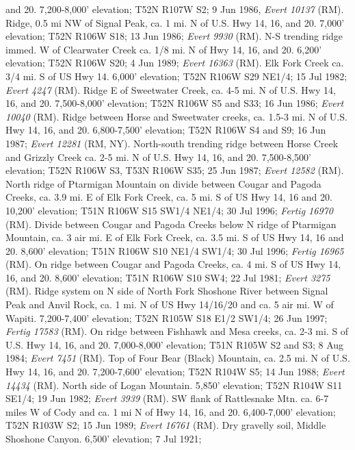 and 20. 7,200-8,000’ elevation; T52N R107W S2; 9 Jun 1986,
\textit{Evert 10137} (RM).
Ridge, 0.5 mi NW of Signal Peak, ca. 1 mi. N of U.S. Hwy 14, 16, and 20. 7,000’
elevation; T52N R106W S18; 13 Jun 1986; \textit{Evert 9930} (RM).
N-S trending ridge immed. W of Clearwater Creek ca. 1/8 mi. N of Hwy 14, 16,
and 20. 6,200’ elevation; T52N R106W S20; 4 Jun 1989; \textit{Evert 16363} (RM).
Elk Fork Creek ca. 3/4 mi. S of US Hwy 14. 6,000’ elevation; T52N R106W S29
NE1/4; 15 Jul 1982; \textit{Evert 4247} (RM).
Ridge E of Sweetwater Creek, ca. 4-5 mi. N of U.S. Hwy 14, 16, and 20.
7,500-8,000’ elevation;  T52N R106W S5 and S33; 16 Jun 1986;
\textit{Evert 10040} (RM).
Ridge between Horse and Sweetwater creeks, ca. 1.5-3 mi. N of U.S. Hwy 14, 16,
and 20. 6,800-7,500’ elevation; T52N R106W S4 and S9; 16 Jun 1987;
\textit{Evert 12281} (RM, NY).
North-south trending ridge between Horse Creek and Grizzly Creek ca. 2-5 mi. N
of U.S. Hwy 14, 16, and 20. 7,500-8,500’ elevation; T52N R106W S3, T53N R106W
S35; 25 Jun 1987; \textit{Evert 12582} (RM).
North ridge of Ptarmigan Mountain on divide between Cougar and Pagoda Creeks,
ca. 3.9 mi. E of Elk Fork Creek, ca. 5 mi. S of US Hwy 14, 16 and 20. 10,200’
elevation; T51N R106W S15 SW1/4 NE1/4; 30 Jul 1996; \textit{Fertig 16970} (RM).
Divide between Cougar and Pagoda Creeks below N ridge of Ptarmigan Mountain,
ca. 3 air mi. E of Elk Fork Creek, ca. 3.5 mi. S of US Hwy 14, 16 and 20.
8,600’ elevation; T51N R106W S10 NE1/4 SW1/4; 30 Jul 1996;
\textit{Fertig 16965} (RM).
On ridge between Cougar and Pagoda Creeks, ca. 4 mi. S of US Hwy 14, 16, and 20.
8,600’ elevation; T51N R106W S10 SW4; 22 Jul 1981; \textit{Evert 3275} (RM).
Ridge system on N side of North Fork Shoshone River between Signal Peak and
Anvil Rock, ca. 1 mi. N of US Hwy 14/16/20 and ca. 5 air mi. W of Wapiti.
7,200-7,400’ elevation; T52N R105W S18 E1/2 SW1/4; 26 Jun 1997;
\textit{Fertig 17583} (RM).
On ridge between Fishhawk and Mesa creeks, ca. 2-3 mi. S of U.S. Hwy 14, 16,
and 20. 7,000-8,000’ elevation; T51N R105W S2 and S3; 8 Aug 1984;
\textit{Evert 7451} (RM).
Top of Four Bear (Black) Mountain, ca. 2.5 mi. N of U.S. Hwy 14, 16, and 20.
7,200-7,600’ elevation; T52N R104W S5; 14 Jun 1988; \textit{Evert 14434} (RM).
North side of Logan Mountain. 5,850’ elevation; T52N R104W S11 SE1/4;
19 Jun 1982; \textit{Evert 3939} (RM).
SW flank of Rattlesnake Mtn. ca. 6-7 miles W of Cody and ca. 1 mi N of Hwy 14,
16, and 20. 6,400-7,000' elevation; T52N R103W S2; 15 Jun 1989;
\textit{Evert 16761} (RM).
Dry gravelly soil, Middle Shoshone Canyon. 6,500’ elevation; 7 Jul 1921;
